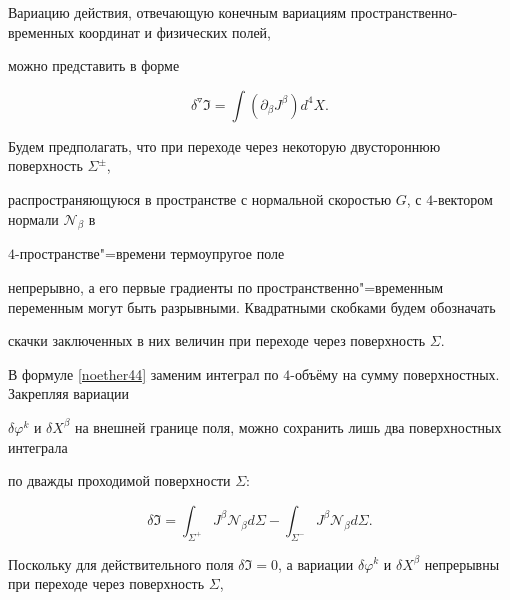 Вариацию действия, отвечающую конечным  вариациям пространственно-временных координат и физических полей,

можно представить в форме \cite{MurashkinRadayev:bib:WPinFTandTM}

\begin{equation}

\label{noether44}

\delta^{\triangledown} \Im= \int{(\partial_\beta J^\beta) d^4 X}.

\end{equation}



Будем предполагать, что при переходе через некоторую двустороннюю  поверхность $\Sigma^{\pm}$,

 распространяющуюся в пространстве с нормальной скоростью $G$,  с $4$-вектором нормали $ {\mathcal  N}_\beta$ в 

 $4$-пространстве"=времени термоупругое поле

непрерывно, а его первые градиенты по пространственно"=временным переменным могут быть разрывными. Квадратными скобками будем обозначать

скачки заключенных в них величин при переходе через поверхность $\Sigma$.



\smallskip




В формуле \eqref{noether44} заменим интеграл по $4$-объёму на сумму поверхностных. Закрепляя вариации

$\delta \varphi ^k$ и $\delta X^\beta$ на внешней границе поля, можно сохранить лишь два поверхностных интеграла

по дважды проходимой поверхности $\Sigma$:

\begin{equation}

\label{y-1}

\delta \Im =\int_{\Sigma^+}{J^\beta{\mathcal N}_\beta d\Sigma}-

 \int _{\Sigma^-}{J^\beta{\mathcal N}_\beta d\Sigma}.

\end{equation}





Поскольку для действительного поля $\delta \Im=0$, а вариации $\delta \varphi ^k$ и $\delta X^\beta$ непрерывны при переходе через поверхность $\Sigma$,

